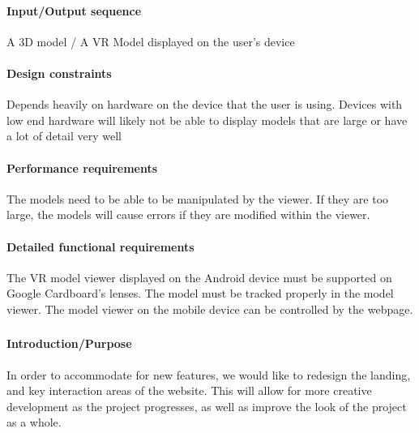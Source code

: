 \documentclass[letterpaper, 10pt, draftclsnofoot, compsoc, onecolumn]{IEEEtran}
\begin{document}
\paragraph[Input/Output sequence]{\rmfamily\bfseries\color{black}
Input/Output sequence }
{\color{black}
	A 3D model / A VR Model displayed on the user's device  
}

\paragraph[Design constraints]{\rmfamily\bfseries\color{black} Design
constraints }
{\color{black}
	Depends heavily on hardware on the device that the user is using. Devices with low end hardware will likely not be able to 
	display models that are large or have a lot of detail very well  
}

\paragraph[Performance requirements]{\rmfamily\bfseries\color{black}
Performance requirements }
{\color{black}
	The models need to be able to be manipulated by the viewer. If they are too large, the models will cause errors if they are 
	modified within the viewer.  
}

\paragraph[Detailed functional requirements]{\rmfamily\bfseries\color{black}
Detailed functional requirements }
{\color{black}
	The VR model viewer displayed on the Android device must be supported on Google Cardboard's lenses. The model must 
	be tracked properly in the model viewer. The model viewer on the mobile device can be controlled by the webpage.  
}


\subsubsection[{Website Redesign}]{\rmfamily\bfseries\color{black} }

\paragraph[Introduction/Purpose of this
feature]{\rmfamily\bfseries\color{black}
Introduction/Purpose }
{\color{black}
	In order to accommodate for new features, we would like to redesign the landing, and key interaction areas of the website. 
	This will allow for more creative development as the project progresses, as well as improve the look of the project as a whole.
}
\smallskip
\end{document}
